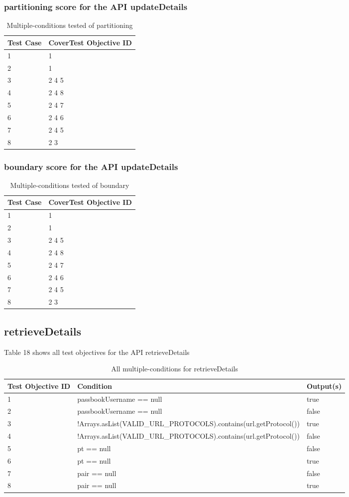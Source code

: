 \documentclass{article}
\begin{document}
\subsubsection{partitioning score for the API updateDetails}
\begin{longtable}{|p{2cm}|p{8cm}|}
\caption{Multiple-conditions tested of partitioning}\\
\hline 
Test Case& CoverTest Objective ID\\
\hline  
1&1\\
\hline
2&1\\
\hline
3&2 4 5\\
\hline
4&2 4 8\\
\hline
5&2 4 7\\
\hline
6&2 4 6\\
\hline
7&2 4 5\\
\hline
8&2 3\\
\hline
\end{longtable}
\subsubsection{boundary score for the API updateDetails}
\begin{longtable}{|p{2cm}|p{8cm}|}
\caption{Multiple-conditions tested of boundary}\\
\hline 
Test Case& CoverTest Objective ID\\
\hline  
1&1\\
\hline
2&1\\
\hline
3&2 4 5\\
\hline
4&2 4 8\\
\hline
5&2 4 7\\
\hline
6&2 4 6\\
\hline
7&2 4 5\\
\hline
8&2 3\\
\hline
\end{longtable}
\subsection{retrieveDetails}
Table 18 shows all test objectives for the API retrieveDetails
\begin{longtable}{|p{2cm}|p{11cm}|p{2cm}|}
\caption{All multiple-conditions for retrieveDetails}\\
\hline 
Test Objective ID&Condition&Output(s)\\
\hline  
1&passbookUsername == null&true\\
\hline
2&passbookUsername == null&false\\
\hline
3&!Arrays.asList(VALID\_URL\_PROTOCOLS).contains(url.getProtocol())&true\\
\hline
4&!Arrays.asList(VALID\_URL\_PROTOCOLS).contains(url.getProtocol())&false\\
\hline
5&pt == null&false\\
\hline
6&pt == null&true\\
\hline
7&pair == null&false\\
\hline
8&pair == null&true\\
\hline
\end{longtable}
\end{document}
